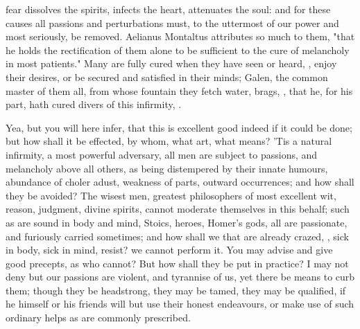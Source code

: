 {fear dissolves the spirits, infects the heart, attenuates the soul: and for these causes all passions and perturbations must, to the uttermost of our power and most seriously, be removed. Aelianus Montaltus attributes so much to them, "that he holds the rectification of them alone to be sufficient to the cure of melancholy in most patients." Many are fully cured when they have seen or heard, \etc{}, enjoy their desires, or be secured and satisfied in their minds; Galen, the common master of them all, from whose fountain they fetch water, brags, , that he, for his part, hath cured divers of this infirmity, .

Yea, but you will here infer, that this is excellent good indeed if it could be done; but how shall it be effected, by whom, what art, what means?  'Tis a natural infirmity, a most powerful adversary, all men are subject to passions, and melancholy above all others, as being distempered by their innate humours, abundance of choler adust, weakness of parts, outward occurrences; and how shall they be avoided? The wisest men, greatest philosophers of most excellent wit, reason, judgment, divine spirits, cannot moderate themselves in this behalf; such as are sound in body and mind, Stoics, heroes, Homer's gods, all are passionate, and furiously carried sometimes; and how shall we that are already crazed, , sick in body, sick in mind, resist? we cannot perform it. You may advise and give good precepts, as who cannot? But how shall they be put in practice? I may not deny but our passions are violent, and tyrannise of us, yet there be means to curb them; though they be headstrong, they may be tamed, they may be qualified, if he himself or his friends will but use their honest endeavours, or make use of such ordinary helps as are commonly prescribed.

}
